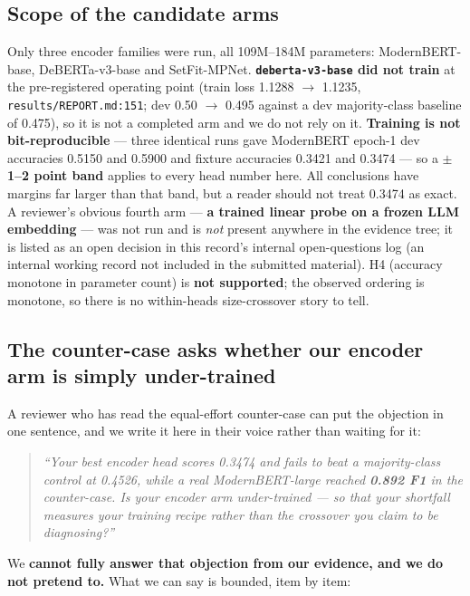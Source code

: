 \documentclass[10pt]{article}
\begin{document}
\subsection{Scope of the candidate arms}

Only three encoder families were run, all 109M--184M parameters: ModernBERT-base, DeBERTa-v3-base and SetFit-MPNet. \textbf{\texttt{deberta-v3-base} did not train} at the pre-registered operating point (train loss 1.1288 $\to$ 1.1235, \texttt{results/REPORT.md:151}; dev 0.50 $\to$ 0.495 against a dev majority-class baseline of 0.475), so it is not a completed arm and we do not rely on it. \textbf{Training is not bit-reproducible} --- three identical runs gave ModernBERT epoch-1 dev accuracies 0.5150 and 0.5900 and fixture accuracies 0.3421 and 0.3474 --- so a \textbf{$\pm$1--2 point band} applies to every head number here. All conclusions have margins far larger than that band, but a reader should not treat 0.3474 as exact. A reviewer's obvious fourth arm --- \textbf{a trained linear probe on a frozen LLM embedding} --- was not run and is \emph{not} present anywhere in the evidence tree; it is listed as an open decision in this record's internal open-questions log (an internal working record not included in the submitted material). H4 (accuracy monotone in parameter count) is \textbf{not supported}; the observed ordering is monotone, so there is no within-heads size-crossover story to tell.

\subsection{The counter-case asks whether our encoder arm is simply under-trained}

A reviewer who has read the equal-effort counter-case can put the objection in one sentence, and we write it here in their voice rather than waiting for it:

\begin{quote}
\emph{``Your best encoder head scores 0.3474 and fails to beat a majority-class control at 0.4526, while a real ModernBERT-large reached \textbf{0.892 F1} in the counter-case. Is your encoder arm under-trained --- so that your shortfall measures your training recipe rather than the crossover you claim to be diagnosing?''}
\end{quote}

We \textbf{cannot fully answer that objection from our evidence, and we do not pretend to.} What we can say is bounded, item by item:
\end{document}
